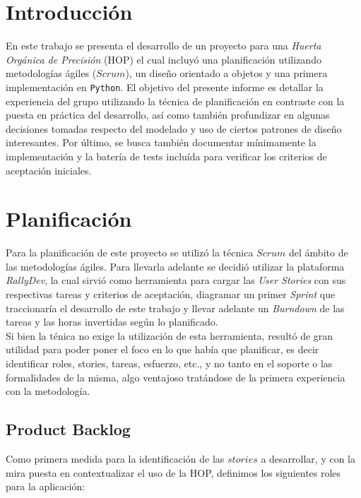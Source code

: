 \section{Introducción}

En este trabajo se presenta el desarrollo de un proyecto para una \textit{Huerta Orgánica de Precisión} (HOP) el cual incluyó una planificación utilizando metodologías ágiles ($Scrum$), un diseño orientado a objetos y una primera implementación en \verb|Python|. El objetivo del presente informe es detallar la experiencia del grupo utilizando la técnica de planificación en contraste con la puesta en práctica del desarrollo, así como también profundizar en algunas decisiones tomadas respecto del modelado y uso de ciertos patrones de diseño interesantes. Por último, se busca también documentar mínimamente la implementación y la batería de tests incluída para verificar los criterios de aceptación iniciales. 

\section{Planificación}

Para la planificación de este proyecto se utilizó la técnica $Scrum$ del ámbito de las metodologías ágiles. Para llevarla adelante se decidió utilizar la plataforma \textsl{RallyDev}, la cual sirvió como herramienta para cargar las \textit{User Stories} con sus respectivas tareas y criterios de aceptación, diagramar un primer \textit{Sprint} que traccionaría el desarrollo de este trabajo y llevar adelante un \textit{Burndown} de las tareas y las horas invertidas según lo planificado.\\
\indent Si bien la ténica no exige la utilización de esta herramienta, resultó de gran utilidad para poder poner el foco en lo que había que planificar, es decir identificar roles, stories, tareas, esfuerzo, etc., y no tanto en el soporte o las formalidades de la misma, algo ventajoso tratándose de la primera experiencia con la metodología.

\subsection{Product Backlog}

Como primera medida para la identificación de las $stories$ a desarrollar, y con la mira puesta en contextualizar el uso de la HOP, definimos los siguientes roles para la aplicación:

